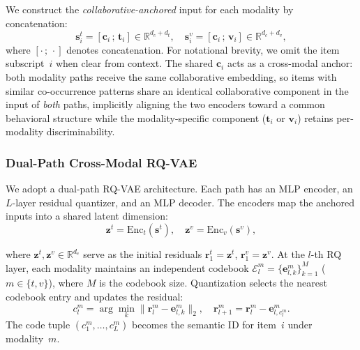 \documentclass[sigconf, anonymous, review]{acmart}
\begin{document}
We construct the \emph{collaborative-anchored} input for each modality by concatenation:
\begin{equation}
    \mathbf{s}_i^t = [\mathbf{c}_i \,;\, \mathbf{t}_i] \in \mathbb{R}^{d_c+d_t}, \quad
    \mathbf{s}_i^v = [\mathbf{c}_i \,;\, \mathbf{v}_i] \in \mathbb{R}^{d_c+d_v},
\end{equation}
where $[\cdot\,;\,\cdot]$ denotes concatenation. For notational brevity, we omit the item subscript~$i$ when clear from context.
%
The shared $\mathbf{c}_i$ acts as a cross-modal anchor: both modality paths receive the same collaborative embedding, so items with similar co-occurrence patterns share an identical collaborative component in the input of \emph{both} paths, implicitly aligning the two encoders toward a common behavioral structure while the modality-specific component ($\mathbf{t}_i$ or $\mathbf{v}_i$) retains per-modality discriminability.

\subsubsection{Dual-Path Cross-Modal RQ-VAE}

We adopt a dual-path RQ-VAE architecture.
% 
Each path has an MLP encoder, an $L$-layer residual quantizer, and an MLP decoder.
% 
The encoders map the anchored inputs into a shared latent dimension:
%
\begin{equation}
    \mathbf{z}^t = \mathrm{Enc}_t(\mathbf{s}^t), \quad
    \mathbf{z}^v = \mathrm{Enc}_v(\mathbf{s}^v),
\end{equation}

where $\mathbf{z}^t, \mathbf{z}^v \in \mathbb{R}^{d_e}$ serve as the initial residuals $\mathbf{r}_1^t = \mathbf{z}^t$, $\mathbf{r}_1^v = \mathbf{z}^v$.
%
At the $l$-th RQ layer, each modality maintains an independent codebook $\mathcal{E}_l^{m} = \{\mathbf{e}_{l,k}^{m}\}_{k=1}^{M}$ ($m \in \{t,v\}$), where $M$ is the codebook size.
% 
Quantization selects the nearest codebook entry and updates the residual:
\begin{equation}
    c_l^{m} = \arg\min_k \|\mathbf{r}_l^m - \mathbf{e}_{l,k}^m\|_2, \quad
    \mathbf{r}_{l+1}^m = \mathbf{r}_l^m - \mathbf{e}_{l,c_l^m}^m.
\end{equation}
The code tuple $(c_1^m, \ldots, c_L^m)$ becomes the semantic ID for item~$i$ under modality~$m$.
\end{document}
